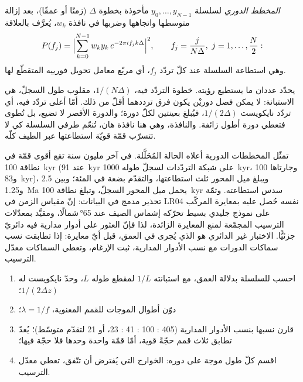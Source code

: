 
\begin{definition}\label{def:b3:sequence-stratigraphy:periodogram}
\emph{المخطط الدوري} لسلسلة $y_0, \dots, y_{N-1}$
مأخوذة بخطوة $\Delta$ (زمنًا أو عمقًا)، بعد إزالة متوسطها واتجاهها
وضربها في نافذة $w_k$، يُعرَّف بالعلاقة
\[
P(f_j) = \Bigl|\sum_{k=0}^{N-1} w_k y_k\, e^{-2\pi i f_j k\Delta}\Bigr|^2,
\qquad f_j = \frac{j}{N\Delta},\ j = 1, \dots, \frac N2:
\]
وهي استطاعة السلسلة عند كلّ تردّد $f_j$، أي مربّع معامل
تحويل فورييه المتقطّع لها.
\end{definition}

يحدّد عددان ما يستطيع  رؤيته. خطوة التردّد فيه، $1/(N\Delta)$،
مقلوب طول السجلّ، هي الاستبانة: لا يمكن فصل دوريْن يكون
فرق ترددهما أقلّ من ذلك. أمّا أعلى تردّد فيه، أي
تردّد نايكويست $1/(2\Delta)$، فيُبلغ بعينتين لكلّ دورة؛ والدورة الأقصر
لا تضيع، بل تُطوى فتعطي دورة أطول زائفة. والنافذة، وهي هنا نافذة هان،
تُنعّم طرفي السلسلة كي لا تتسرّب قمّة قويّة
استطاعتها عبر الطيف كلّه.


تمثّل المخططات الدورية أعلاه الحالة المُحَلَّلة. في آخر مليون سنة تقع أقوى
قمّة في نطاقة \qty{100}{kyr} (عند \qty{91}{kyr} على شبكة التردّدات
لسجلّ طوله \qty{1000}{kyr}، وجارتاها 100 و\qty{83}{kyr})،
ويبلغ ميل المحور ثلث استطاعتها، والتقدّم بضعة في المئة؛
وبين 2.5 و\qty{1.25}{Ma} يحمل ميل المحور السجلّ، وتبلغ
نطاقة \qty{100}{kyr} سدس استطاعته. وثمّة تحذير مدمج في
البيانات: إنّ مقياس الزمن في LR04 نفسه حُصل عليه بمعايرة المركّب على نموذج
جليدي بسيط تحرّكه إشماس الصيف عند \ang{65}\,شمالًا، ومقيَّد بمعدّلات الترسيب المجمّعة
لمنع المعايرة الزائدة، لذا فإنّ العثور على أدوار مدارية فيه
دائريّ جزئيًّا. الاختبار غير الدائري هو الذي يُجرى في العمق،
قبل أيّ معايرة: إذا تطابقت نسب سماكات الدورات مع
نسب الأدوار المدارية، ثبت الإرغام، وتعطي السماكات
معدّل الترسيب.

\begin{method}\label{met:b3:sequence-stratigraphy:cycles}
\begin{enumerate}
\item احسب  للسلسلة بدلالة العمق، مع استبانته
  $1/L$ لمقطع طوله $L$، وحدّ نايكويست له $1/(2\Delta z)$؛
\item دوّن أطوال الموجات للقمم المعنوية، $\lambda = 1/f$؛
\item قارن نسبها بنسب الأدوار المدارية (405 : 100 : 41
  : 23، أو 21 لتقدّم متوسّط)؛ يُعدّ تطابق ثلاث قمم حجّةً قوية،
  أمّا قمّة واحدة وحدها فلا حجّة فيها؛
\item اقسم كلّ طول موجة على دوره: الخوارج التي يُفترض أن تتّفق،
  تعطي معدّل الترسيب.
\end{enumerate}
\end{method}

